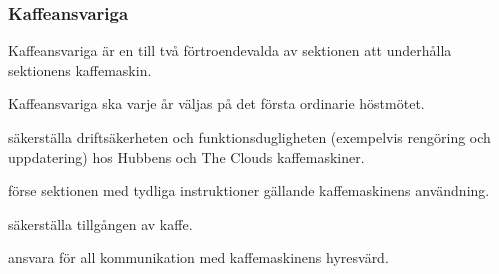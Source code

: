 \subsubsection{Kaffeansvariga}
Kaffeansvariga är en till två förtroendevalda av sektionen att underhålla sektionens kaffemaskin.

Kaffeansvariga ska varje år väljas på det första ordinarie höstmötet. 

\begin{att}
    \item säkerställa driftsäkerheten och funktionsdugligheten (exempelvis rengöring och uppdatering) hos Hubbens och The Clouds kaffemaskiner.
    \item förse sektionen med tydliga instruktioner gällande kaffemaskinens användning.
    \item säkerställa tillgången av kaffe.
    \item ansvara för all kommunikation med kaffemaskinens hyresvärd.
\end{att}